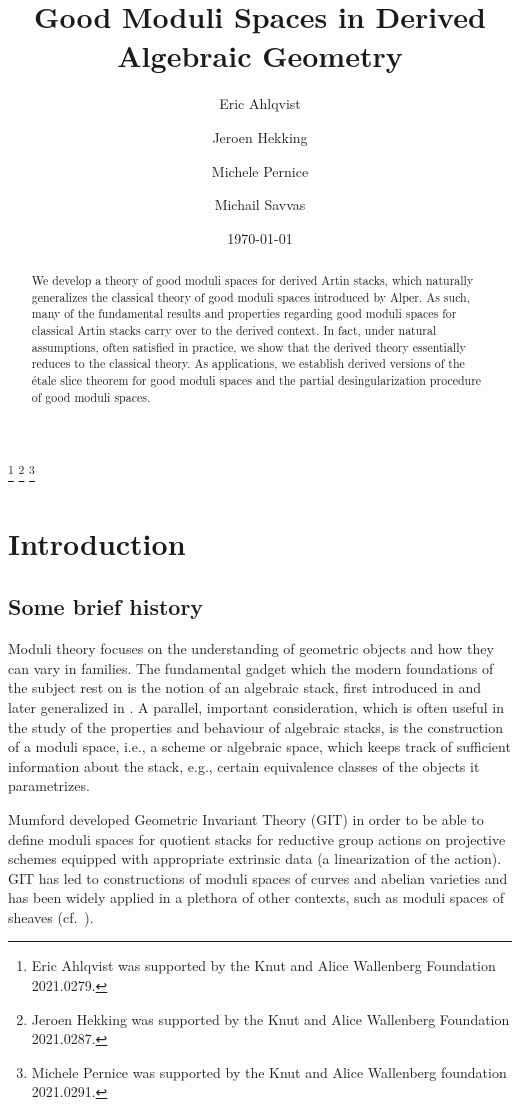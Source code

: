 \documentclass[a4paper,twoside,11pt]{amsart}
\title[Derived Good Moduli Spaces]{Good Moduli Spaces in Derived Algebraic Geometry}
\author[E. Ahlqvist]{Eric Ahlqvist}
\author[J. Hekking]{Jeroen Hekking}
\author[M. Pernice]{Michele Pernice}
\author[M. Savvas]{Michail Savvas}
\date{\today}
\theoremstyle{plain}
\theoremstyle{definition}
\theoremstyle{remark}
\numberwithin{equation}{section}
\begin{document}
\begin{abstract}
		We develop a theory of good moduli spaces for derived Artin stacks, which naturally generalizes the classical theory of good moduli spaces introduced by Alper. As such, many of the fundamental results and properties regarding good moduli spaces for classical Artin stacks carry over to the derived context. In fact, under natural assumptions, often satisfied in practice, we show that the derived theory essentially reduces to the classical theory. As applications, we establish derived versions of the \'{e}tale slice theorem for good moduli spaces and the partial desingularization procedure of good moduli spaces.            
	\end{abstract}
 
\thanks{Eric Ahlqvist was supported by the Knut and Alice Wallenberg Foundation 2021.0279.}
\thanks{Jeroen Hekking was supported by the Knut and Alice Wallenberg Foundation 2021.0287.}
\thanks{Michele Pernice was supported by the Knut and Alice Wallenberg foundation 2021.0291.}

\maketitle

 
\setcounter{tocdepth}{1}
\tableofcontents
\setcounter{tocdepth}{2}

\section*{Introduction}

\subsection*{Some brief history} Moduli theory focuses on the understanding of geometric objects and how they can vary in families. The fundamental gadget which the modern foundations of the subject rest on is the notion of an algebraic stack, first introduced in \cite{DeligneMumfordSt} and later generalized in \cite{ArtinStacks}. A parallel, important consideration, which is often useful in the study of the properties and behaviour of algebraic stacks, is the construction of a moduli space, i.e., a scheme or algebraic space, which keeps track of sufficient information about the stack, e.g., certain equivalence classes of the objects it parametrizes. 

Mumford developed Geometric Invariant Theory (GIT) \cite{MumfordGIT} in order to be able to define moduli spaces for quotient stacks for reductive group actions on projective schemes equipped with appropriate extrinsic data (a linearization of the action). GIT has led to constructions of moduli spaces of curves and abelian varieties and has been widely applied in a plethora of other contexts, such as moduli spaces of sheaves (cf.~\cite{HuyLehn}). 
\end{document}
